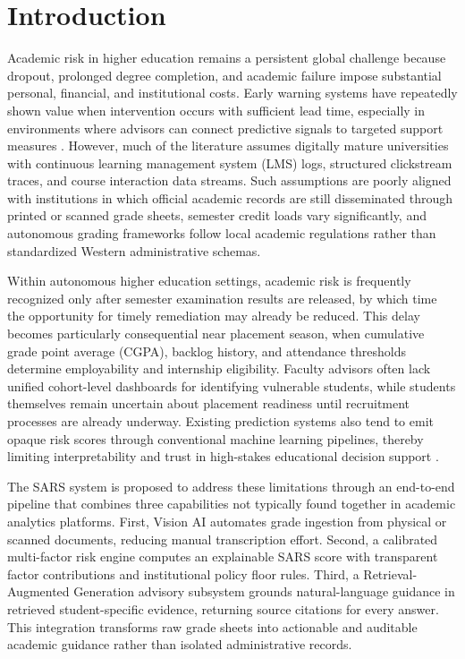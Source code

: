 \documentclass[conference]{IEEEtran}
\begin{document}
\section{Introduction}
Academic risk in higher education remains a persistent global challenge because dropout, prolonged degree completion, and academic failure impose substantial personal, financial, and institutional costs. Early warning systems have repeatedly shown value when intervention occurs with sufficient lead time, especially in environments where advisors can connect predictive signals to targeted support measures \cite{baker2014edm,essa2012predictive,arnold2012course}. However, much of the literature assumes digitally mature universities with continuous learning management system (LMS) logs, structured clickstream traces, and course interaction data streams. Such assumptions are poorly aligned with institutions in which official academic records are still disseminated through printed or scanned grade sheets, semester credit loads vary significantly, and autonomous grading frameworks follow local academic regulations rather than standardized Western administrative schemas.

Within autonomous higher education settings, academic risk is frequently recognized only after semester examination results are released, by which time the opportunity for timely remediation may already be reduced. This delay becomes particularly consequential near placement season, when cumulative grade point average (CGPA), backlog history, and attendance thresholds determine employability and internship eligibility. Faculty advisors often lack unified cohort-level dashboards for identifying vulnerable students, while students themselves remain uncertain about placement readiness until recruitment processes are already underway. Existing prediction systems also tend to emit opaque risk scores through conventional machine learning pipelines, thereby limiting interpretability and trust in high-stakes educational decision support \cite{jayaprakash2014early,romero2020survey,khosravi2022xai}.

The SARS system is proposed to address these limitations through an end-to-end pipeline that combines three capabilities not typically found together in academic analytics platforms. First, Vision AI automates grade ingestion from physical or scanned documents, reducing manual transcription effort. Second, a calibrated multi-factor risk engine computes an explainable SARS score with transparent factor contributions and institutional policy floor rules. Third, a Retrieval-Augmented Generation advisory subsystem grounds natural-language guidance in retrieved student-specific evidence, returning source citations for every answer. This integration transforms raw grade sheets into actionable and auditable academic guidance rather than isolated administrative records.
\end{document}
